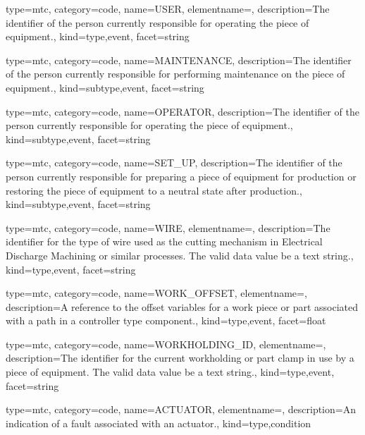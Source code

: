 {
  type=mtc,
  category=code,
  name={USER},
  elementname=,
  description={The identifier of the person currently responsible for operating the piece of equipment.},
  kind={type,event},
  facet={\gls{string}}
}


{
  type=mtc,
  category=code,
  name={MAINTENANCE},
  description={The identifier of the person currently responsible for performing maintenance on the piece of equipment.},
  kind={subtype,event},
  facet={\gls{string}}
}


{
  type=mtc,
  category=code,
  name={OPERATOR},
  description={The identifier of the person currently responsible for operating the piece of equipment.},
  kind={subtype,event},
  facet={\gls{string}}
}


{
  type=mtc,
  category=code,
  name={SET\_UP},
  description={The identifier of the person currently responsible for preparing a piece of equipment for production or restoring the piece of equipment to a neutral state after production.},
  kind={subtype,event},
  facet={\gls{string}}
}


{
  type=mtc,
  category=code,
  name={WIRE},
  elementname=,
  description={The identifier for the type of wire used as the cutting mechanism in Electrical Discharge Machining or similar processes. \newline The \gls{valid data value} \must be a text string.},
  kind={type,event},
  facet={\gls{string}}
}


{
  type=mtc,
  category=code,
  name={WORK\_OFFSET},
  elementname=,
  description={A reference to the offset variables for a work piece or part associated with a \gls{path} in a \gls{controller} type component.},
  kind={type,event},
  facet={\gls{float}}
}


{
  type=mtc,
  category=code,
  name={WORKHOLDING\_ID},
  elementname=,
  description={The identifier for the current workholding or part clamp in use by a piece of equipment. \newline The \gls{valid data value} \must be a text string.},
  kind={type,event},
  facet={\gls{string}}
}


{
  type=mtc,
  category=code,
  name={ACTUATOR},
  elementname=,
  description={An indication of a fault associated with an actuator.},
  kind={type,condition}
}


